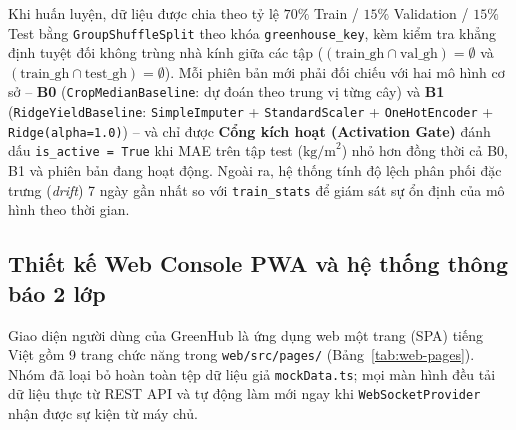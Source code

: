 Khi huấn luyện, dữ liệu được chia theo tỷ lệ \(70\%\) Train / \(15\%\) Validation / \(15\%\) Test bằng \texttt{GroupShuffleSplit} theo khóa \texttt{greenhouse\_key}, kèm kiểm tra khẳng định tuyệt đối không trùng nhà kính giữa các tập (\((\text{train\_gh} \cap \text{val\_gh}) = \emptyset\) và \((\text{train\_gh} \cap \text{test\_gh}) = \emptyset\)). Mỗi phiên bản mới phải đối chiếu với hai mô hình cơ sở -- \textbf{B0} (\texttt{CropMedianBaseline}: dự đoán theo trung vị từng cây) và \textbf{B1} (\texttt{RidgeYieldBaseline}: \texttt{SimpleImputer} + \texttt{StandardScaler} + \texttt{OneHotEncoder} + \texttt{Ridge(alpha=1.0)}) -- và chỉ được \textbf{Cổng kích hoạt (Activation Gate)} đánh dấu \texttt{is\_active = True} khi MAE trên tập test (\(\text{kg/m}^2\)) nhỏ hơn đồng thời cả B0, B1 và phiên bản đang hoạt động. Ngoài ra, hệ thống tính độ lệch phân phối đặc trưng (\textit{drift}) 7 ngày gần nhất so với \texttt{train\_stats} để giám sát sự ổn định của mô hình theo thời gian.

\subsection{Thiết kế Web Console PWA và hệ thống thông báo 2 lớp}
\label{subsec:c3-web-notify}

Giao diện người dùng của GreenHub là ứng dụng web một trang (SPA) tiếng Việt gồm 9 trang chức năng trong \texttt{web/src/pages/} (Bảng~\ref{tab:web-pages}). Nhóm đã loại bỏ hoàn toàn tệp dữ liệu giả \texttt{mockData.ts}; mọi màn hình đều tải dữ liệu thực từ REST API và tự động làm mới ngay khi \texttt{WebSocketProvider} nhận được sự kiện từ máy chủ.

